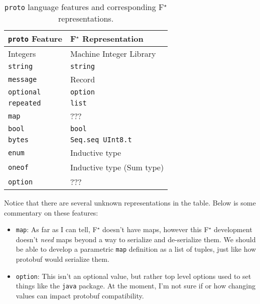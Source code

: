 \documentclass[11pt]{article}
\theoremstyle{definition}
\theoremstyle{plain}
\newcommand{\fstar}{F$^\star$}
\begin{document}
\begin{table}[H]
	\centering
	\begin{tabular}{ll}
		\toprule
		\texttt{proto} Feature & \fstar{} Representation   \\
		\midrule
		Integers               & Machine Integer Library   \\
		\texttt{string}        & \texttt{string}           \\
		\texttt{message}       & Record                    \\
		\texttt{optional}      & \texttt{option}           \\
		\texttt{repeated}      & \texttt{list}             \\
		\texttt{map}           & ???                       \\
		\texttt{bool}          & \texttt{bool}             \\
		\texttt{bytes}         & \texttt{Seq.seq UInt8.t}  \\
		\texttt{enum}          & Inductive type            \\
		\texttt{oneof}         & Inductive type (Sum type) \\
		\texttt{option}        & ???                       \\
		\bottomrule
	\end{tabular}

	\vspace{4mm}
	\caption[]{\texttt{proto} language features and corresponding \fstar{} representations.}
\end{table}

Notice that there are several unknown representations in the table. Below is
some commentary on these features:

\begin{itemize}
	\item \texttt{map}: As far as I can tell, \fstar{} doesn't have maps, however
	      this \fstar{} development doesn't \emph{need} maps beyond a way to serialize
	      and de-serialize them. We should be able to develop a parametric
	      \texttt{map} definition as a list of tuples, just like how protobuf would
	      serialize them.
	\item \texttt{option}: This isn't an optional value, but rather top level
	      options used to set things like the \texttt{java} package. At the moment,
	      I'm not sure if or how changing values can impact protobuf compatibility.
\end{itemize}
\end{document}
